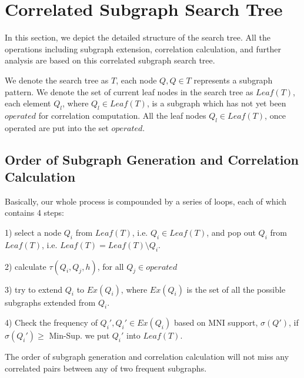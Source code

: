 \section{Correlated Subgraph Search Tree}
\label{sec:searchTree}
In this section, we depict the detailed structure of the search tree. All the operations including subgraph extension, correlation calculation, and further analysis are based on this correlated subgraph search tree.




We denote the search tree as $T$, each node $Q,Q\in T$ represents a subgraph pattern. We denote the set of current leaf nodes in the search tree as $Leaf(T)$, each element $Q_l$, where $Q_l\in Leaf(T)$, is a subgraph which has not yet been $operated$ for correlation computation. All the leaf nodes $Q_l\in Leaf(T)$, once operated are put into the set $operated$.
\subsection{Order of Subgraph Generation and Correlation Calculation}

\par Basically, our whole process is compounded by a series of loops, each of which contains 4 steps:
\par 1) select a node $Q_i$ from $Leaf(T)$, i.e. $Q_i\in Leaf(T)$, and pop out $Q_i$ from $Leaf(T)$, i.e. $Leaf(T)=Leaf(T)\setminus Q_i$.
\par 2) calculate $\tau(Q_i,Q_j,h)$, for all $Q_j\in operated$
\par 3) try to extend $Q_i$ to $Ex(Q_i)$, where $Ex(Q_i)$ is the set of all the possible subgraphs extended from $Q_i$.
\par 4) Check the frequency of $Q_i',Q_i'\in Ex(Q_i)$ based on MNI support, $\sigma(Q')$, if $\sigma(Q_i')\ge$ {\sf Min-Sup}. we put $Q_i'$ into $Leaf(T)$.
	\begin{thrm}
		The order of subgraph generation and correlation calculation will not miss any correlated pairs between any of two frequent subgraphs.
	\end{thrm}	
